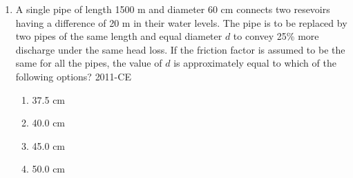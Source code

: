 \documentclass[journal,12pt,onecolumn]{IEEEtran}
\theoremstyle{remark}
\begin{document}
\begin{enumerate}
\begin{figure}[ht]
\centering

\end{figure}
	\begin{multicols}{4}
	\begin{enumerate}
		\item 5 kPa
		\item 10 kPa
		\item 15 kPa
		\item 20 kPa
	\end{enumerate}
	\end{multicols}
\newpage
\item A single pipe of length 1500 m and diameter 60 cm connects two resevoirs having a difference of 20 m in their water levels. The pipe is to be replaced by two pipes of the same length and equal diameter $d$ to convey 25\% more discharge under the same head loss. If the friction factor is assumed to be the same for all the pipes, the value of $d$ is approximately equal to which of the following options?
	\hfill{2011-CE}

	\begin{multicols}{4}
	\begin{enumerate}
		\item 37.5 cm
		\item 40.0 cm
		\item 45.0 cm
		\item 50.0 cm
	\end{enumerate}
	\end{multicols}

\end{enumerate}
\end{document}
